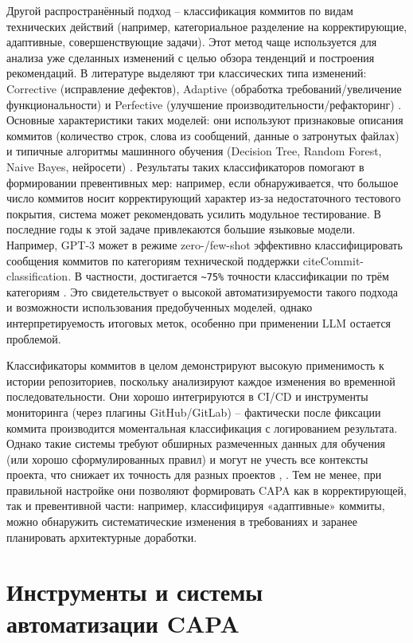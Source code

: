Другой распространённый подход – классификация коммитов по видам технических действий (например, категориальное разделение на корректирующие, адаптивные, совершенствующие задачи). Этот метод чаще используется для анализа уже сделанных изменений с целью обзора тенденций и построения рекомендаций. В литературе выделяют три классических типа изменений: Corrective (исправление дефектов), Adaptive (обработка требований/увеличение функциональности) и Perfective (улучшение производительности/рефакторинг) \cite{Commit-classification}. Основные характеристики таких моделей: они используют признаковые описания коммитов (количество строк, слова из сообщений, данные о затронутых файлах) и типичные алгоритмы машинного обучения (Decision Tree, Random Forest, Naive Bayes, нейросети) \cite{Commit-classification}. Результаты таких классификаторов помогают в формировании превентивных мер: например, если обнаруживается, что большое число коммитов носит корректирующий характер из-за недостаточного тестового покрытия, система может рекомендовать усилить модульное тестирование. В последние годы к этой задаче привлекаются большие языковые модели. Например, GPT-3 может в режиме zero-/few-shot эффективно классифицировать сообщения коммитов по категориям технической поддержки cite{Commit-classification}. В частности, достигается \verb|~75%| точности классификации  по трём категориям \cite{Commit-classification}.
Это свидетельствует о высокой автоматизируемости такого подхода и возможности использования предобученных моделей, однако интерпретируемость итоговых меток, особенно при применении LLM остается проблемой.

Классификаторы коммитов в целом демонстрируют высокую применимость к истории репозиториев, поскольку анализируют каждое изменения во временной последовательности. Они хорошо интегрируются в CI/CD и инструменты мониторинга (через плагины GitHub/GitLab) – фактически после фиксации коммита производится моментальная классификация с логированием результата. Однако такие системы требуют обширных размеченных данных для обучения (или хорошо сформулированных правил) и могут не учесть все контексты проекта, что снижает их точность для разных проектов \cite{Commit-classification}, \cite{Sazid}. Тем не менее, при правильной настройке они позволяют формировать CAPA как в корректирующей, так и превентивной части: например, классифицируя «адаптивные» коммиты, можно обнаружить систематические изменения в требованиях и заранее планировать архитектурные доработки.

\section{Инструменты и системы автоматизации CAPA} \label{ch1:sec4}

